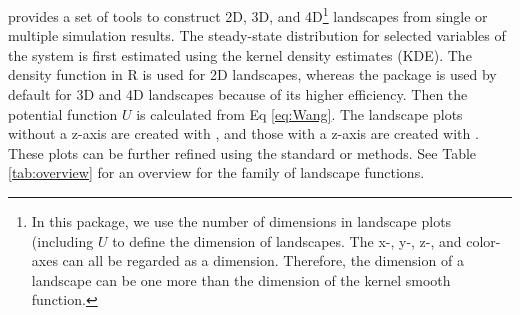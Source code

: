  provides a set of tools to construct 2D, 3D, and 4D\footnote{In this package, we use the number of dimensions in landscape plots (including \(U\) to define the dimension of landscapes. The x-, y-, z-, and color- axes can all be regarded as a dimension. Therefore, the dimension of a landscape can be one more than the dimension of the kernel smooth function.} landscapes from single or multiple simulation results. The steady-state distribution for selected variables of the system is first estimated using the kernel density estimates (KDE). The density function in R is used for 2D landscapes, whereas the  package \citep{ChaconDuongMultivariateKernelSmoothing2018} is used by default for 3D and 4D landscapes because of its higher efficiency. Then the potential function \(U\) is calculated from Eq \eqref{eq:Wang}. The landscape plots without a z-axis are created with  \citep{WickhamGgplot2ElegantGraphics2016}, and those with a z-axis are created with  \citep{SievertInteractiveWebbasedData2020}. These plots can be further refined using the standard  or  methods. See Table \ref{tab:overview} for an overview for the family of landscape functions.

